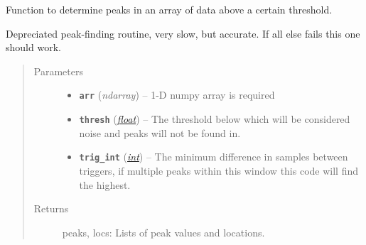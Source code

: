 \documentclass[a4paper,10pt,english]{sphinxmanual}
\begin{document}
\begin{fulllineitems}
\label{submodules/utils.findpeaks:findpeaks.find_peaks_dep}
Function to determine peaks in an array of data above a certain threshold.

Depreciated peak-finding routine, very slow, but accurate.  If all else fails
this one should work.
\begin{quote}\begin{description}
\item[{Parameters}] \leavevmode\begin{itemize}
\item {} 
\textbf{\texttt{arr}} (\emph{ndarray}) -- 1-D numpy array is required

\item {} 
\textbf{\texttt{thresh}} (\href{https://docs.python.org/library/functions.html\#float}{\emph{float}}) -- The threshold below which will be considered noise and peaks    will not be found in.

\item {} 
\textbf{\texttt{trig\_int}} (\href{https://docs.python.org/library/functions.html\#int}{\emph{int}}) -- The minimum difference in samples between triggers,    if multiple peaks within this window this code will find the highest.

\end{itemize}

\item[{Returns}] \leavevmode
peaks, locs: Lists of peak values and locations.

\end{description}\end{quote}

\end{fulllineitems}

\end{document}
